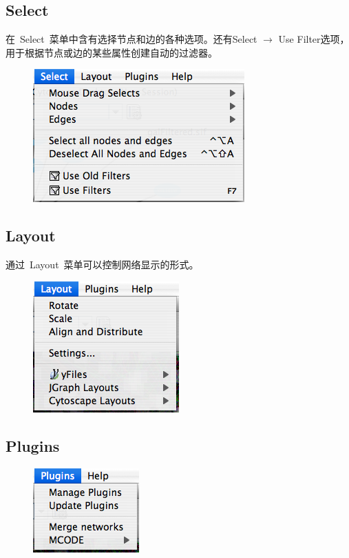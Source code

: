 	\subsection{Select}
	在~Select~菜单中含有选择节点和边的各种选项。还有Select $\rightarrow$ Use Filter选项，用于根据节点或边的某些属性创建自动的过滤器。

	\begin{figure}[!h]
	\centerline{\includegraphics[scale=0.6]{images/menu_select_26.png}}
	\end{figure}

	\subsection{Layout}
	通过~Layout~菜单可以控制网络显示的形式。

	\begin{figure}[!h]
	\centerline{\includegraphics[scale=0.6]{images/menu_layout_25.png}}
	\end{figure}
	
		
	
	\subsection{Plugins}
	\begin{figure}[!h]
	\centerline{\includegraphics[scale=0.6]{images/menu_plugins_25.png}}
	\end{figure}
	
